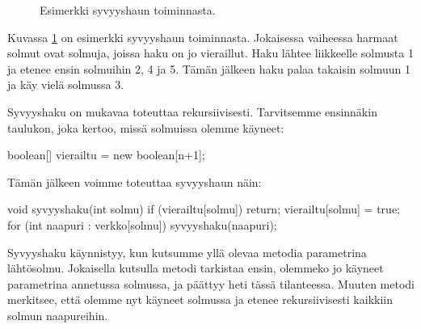 \begin{figure}
\begin{center}
\end{center}
\caption{Esimerkki syvyyshaun toiminnasta.}
\label{fig:syvhak}
\end{figure}

Kuvassa \ref{fig:syvhak} on esimerkki syvyyshaun toiminnasta.
Jokaisessa vaiheessa harmaat solmut ovat solmuja,
joissa haku on jo vieraillut.
Haku lähtee liikkeelle solmusta 1 ja etenee ensin
solmuihin 2, 4 ja 5.
Tämän jälkeen haku palaa takaisin solmuun 1
ja käy vielä solmussa 3.

Syvyyshaku on mukavaa toteuttaa rekursiivisesti.
Tarvitsemme ensinnäkin taulukon, joka kertoo,
missä solmuissa olemme käyneet:

\begin{code}
boolean[] vierailtu = new boolean[n+1];
\end{code}

Tämän jälkeen voimme toteuttaa syvyyshaun näin:

\begin{code}
void syvyyshaku(int solmu) {
    if (vierailtu[solmu]) return;
    vierailtu[solmu] = true;
    for (int naapuri : verkko[solmu]) {
        syvyyshaku(naapuri);
    }
}
\end{code}

Syvyyshaku käynnistyy, kun kutsumme yllä olevaa metodia
parametrina lähtösolmu.
Jokaisella kutsulla metodi tarkistaa ensin,
olemmeko jo käyneet parametrina annetussa solmussa,
ja päättyy heti tässä tilanteessa.
Muuten metodi merkitsee, että olemme nyt käyneet solmussa
ja etenee rekursiivisesti kaikkiin solmun naapureihin.

